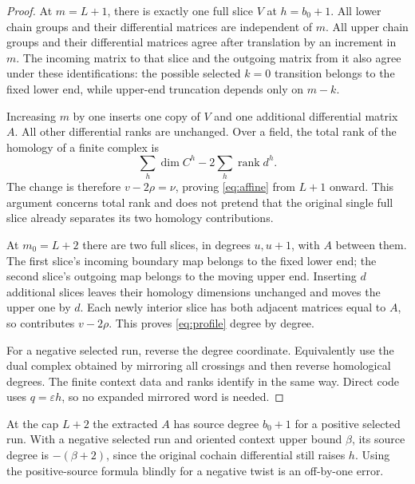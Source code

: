 \documentclass[11pt]{article}
\theoremstyle{definition}
\theoremstyle{remark}
\newcommand{\rank}{\operatorname{rank}}
\begin{document}
\begin{proof}
At $m=L+1$, there is exactly one full slice $V$ at $h=b_0+1$. All lower chain groups and their differential matrices are independent of $m$. All upper chain groups and their differential matrices agree after translation by an increment in $m$. The incoming matrix to that slice and the outgoing matrix from it also agree under these identifications: the possible selected $k=0$ transition belongs to the fixed lower end, while upper-end truncation depends only on $m-k$.

Increasing $m$ by one inserts one copy of $V$ and one additional differential matrix $A$. All other differential ranks are unchanged. Over a field, the total rank of the homology of a finite complex is
\[
 \sum_h\dim C^h-2\sum_h\rank d^h.
\]
The change is therefore $v-2\rho=\nu$, proving \eqref{eq:affine} from $L+1$ onward. This argument concerns total rank and does not pretend that the original single full slice already separates its two homology contributions.

At $m_0=L+2$ there are two full slices, in degrees $u,u+1$, with $A$ between them. The first slice's incoming boundary map belongs to the fixed lower end; the second slice's outgoing map belongs to the moving upper end. Inserting $d$ additional slices leaves their homology dimensions unchanged and moves the upper one by $d$. Each newly interior slice has both adjacent matrices equal to $A$, so contributes $v-2\rho$. This proves \eqref{eq:profile} degree by degree.

For a negative selected run, reverse the degree coordinate. Equivalently use the dual complex obtained by mirroring all crossings and then reverse homological degrees. The finite context data and ranks identify in the same way. Direct code uses $q=\varepsilon h$, so no expanded mirrored word is needed.
\end{proof}

At the cap $L+2$ the extracted $A$ has source degree $b_0+1$ for a positive selected run. With a negative selected run and oriented context upper bound $\beta$, its source degree is $-(\beta+2)$, since the original cochain differential still raises $h$. Using the positive-source formula blindly for a negative twist is an off-by-one error.
\end{document}
